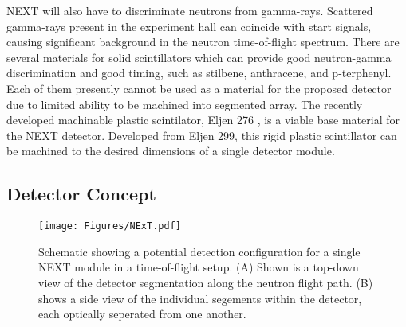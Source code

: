 \documentclass[preprint,3p,twocolumn]{elsarticle}
\begin{document}

NEXT will also have to discriminate neutrons from gamma-rays. Scattered gamma-rays present in the experiment hall can coincide with start signals, causing significant background in the neutron time-of-flight spectrum.
There are several materials for solid scintillators which can provide good neutron-gamma discrimination and good timing, such as stilbene, anthracene, and p-terphenyl. Each of them presently cannot be used as a material for the proposed detector due to limited ability to be machined into segmented array. The recently developed machinable plastic scintilator, Eljen 276 \cite{ZAITSEVA201897}, is a viable base material for the NEXT detector. Developed from Eljen 299, this rigid plastic scintillator can be machined to the desired dimensions of a single detector module. 

\subsection{Detector Concept}
\begin{figure}[htp]
  \centering
  \texttt{[image: Figures/NExT.pdf]}
  \caption{Schematic showing a potential detection configuration for a single NEXT module in a time-of-flight setup. (A) Shown is a top-down view of the detector segmentation along the neutron flight path. (B) shows a side view of the individual segements within the detector, each optically seperated from one another.}
  \label{fig:NEXTschematic}
\end{figure}
\end{document}
